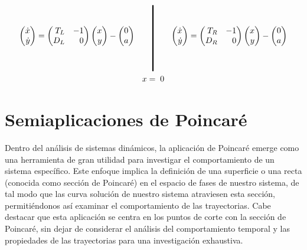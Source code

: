 \documentclass[12pt,a4paper]{report} %
\begin{document}
	\begin{equation}
		\label{eq:lienardrlgr}
		\begin{gathered}
			\begin{pmatrix*}[r]
				\dot{x}\\ \dot{y}
			\end{pmatrix*}= \begin{pmatrix*}[r]
				T_L & -1 \\ D_L & 0
			\end{pmatrix*} \begin{pmatrix*}[r]
				x \\ y
			\end{pmatrix*}-\begin{pmatrix*}[c]
				0 \\ a
			\end{pmatrix*} \qquad 
			\rule[-40pt]{1.5pt}{80pt} \qquad 
			\begin{pmatrix*}[r]
				\dot{x}\\ \dot{y}
			\end{pmatrix*}= \begin{pmatrix*}[r]
				T_R & -1 \\ D_R & 0
			\end{pmatrix*} \begin{pmatrix*}[r]
				x \\ y
			\end{pmatrix*}-\begin{pmatrix*}[c]
				0 \\ a
			\end{pmatrix*} \\ x=\;0
		\end{gathered}
	\end{equation}\smallskip
	
	\newpage
	
	\chapter{Semiaplicaciones de Poincaré}
	\label{sec:4}
	Dentro del análisis de sistemas dinámicos, la aplicación de Poincaré emerge como una herramienta de gran utilidad para investigar el comportamiento de un sistema específico. Este enfoque implica la definición de una superficie o una recta (conocida como sección de Poincaré) en el espacio de fases de nuestro sistema, de tal modo que las curva solución de  nuestro sistema atraviesen esta sección, permitiéndonos así examinar el comportamiento de las trayectorias. Cabe destacar que esta aplicación se centra en los puntos de corte con la sección de Poincaré, sin dejar de considerar el análisis del comportamiento temporal y las propiedades de las trayectorias para una investigación exhaustiva.
	
\end{document}
